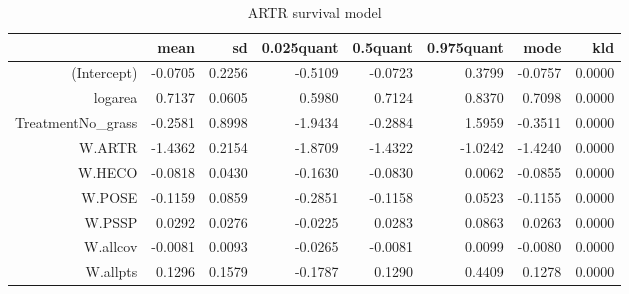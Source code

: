 \begin{table}[ht]
\centering
\begin{tabular}{rrrrrrrr}
  \hline
 & mean & sd & 0.025quant & 0.5quant & 0.975quant & mode & kld \\ 
  \hline
(Intercept) & -0.0705 & 0.2256 & -0.5109 & -0.0723 & 0.3799 & -0.0757 & 0.0000 \\ 
  logarea & 0.7137 & 0.0605 & 0.5980 & 0.7124 & 0.8370 & 0.7098 & 0.0000 \\ 
  TreatmentNo\_grass & -0.2581 & 0.8998 & -1.9434 & -0.2884 & 1.5959 & -0.3511 & 0.0000 \\ 
  W.ARTR & -1.4362 & 0.2154 & -1.8709 & -1.4322 & -1.0242 & -1.4240 & 0.0000 \\ 
  W.HECO & -0.0818 & 0.0430 & -0.1630 & -0.0830 & 0.0062 & -0.0855 & 0.0000 \\ 
  W.POSE & -0.1159 & 0.0859 & -0.2851 & -0.1158 & 0.0523 & -0.1155 & 0.0000 \\ 
  W.PSSP & 0.0292 & 0.0276 & -0.0225 & 0.0283 & 0.0863 & 0.0263 & 0.0000 \\ 
  W.allcov & -0.0081 & 0.0093 & -0.0265 & -0.0081 & 0.0099 & -0.0080 & 0.0000 \\ 
  W.allpts & 0.1296 & 0.1579 & -0.1787 & 0.1290 & 0.4409 & 0.1278 & 0.0000 \\ 
   \hline
\end{tabular}
\caption{ARTR survival model} 
\label{ARTRsurvival}
\end{table}

